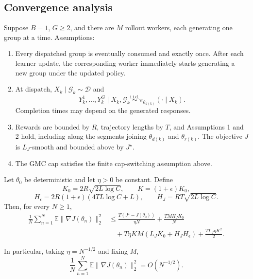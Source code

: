 \subsection{Convergence analysis}


\begin{theorem}
\label{thm:async_gmc}
Suppose $B=1$, $G\ge 2$, and there are $M$ rollout workers,
each generating one group at a time. Assumptions:
\begin{enumerate}
    \item Every dispatched group is eventually consumed and exactly once.
    After each learner update, the corresponding worker immediately
    starts generating a new group under the updated policy.

    \item At dispatch, $X_k\mid\mathcal G_k\sim\mathcal D$ and
    \[
    Y_k^1,\ldots,Y_k^G\mid X_k,\mathcal G_k
    \overset{\mathrm{i.i.d.}}{\sim}
    \pi_{\theta_{d(k)}}(\cdot\mid X_k).
    \]
    Completion times may depend on the generated responses.

    \item Rewards are bounded by $R$, trajectory lengths by $T$,
    and Assumptions 1 and 2 hold, including along the segments
    joining $\theta_{d(k)}$ and $\theta_{r(k)}$.
    The objective $J$ is $L_J$-smooth and bounded above by $J^\star$.

    \item The GMC cap satisfies the finite cap-switching
    assumption above.
\end{enumerate}

Let $\theta_0$ be deterministic and let $\eta>0$ be constant.
Define
\[
K_0=2R\sqrt{2L\log C},\qquad
K=(1+\epsilon)K_0,
\]
\[
H_\epsilon=2R(1+\epsilon)(4TL\log C+L),
\qquad
H_J=RT\sqrt{2L\log C}.
\]
Then, for every $N\ge 1$,
\begin{align*}
\frac1N\sum_{n=1}^N
\mathbb E\|\nabla J(\theta_n)\|_2^2
&\le
\frac{T(J^\star-J(\theta_0))}{\eta N}
+\frac{TMH_JK_0}{N}\\
&\quad+
T\eta KM(L_JK_0+H_JH_\epsilon)
+\frac{TL_J\eta K^2}{2}.
\end{align*}

In particular, taking $\eta=N^{-1/2}$ and fixing $M$,
\[
\frac1N\sum_{n=1}^N
\mathbb E\|\nabla J(\theta_n)\|_2^2
=O(N^{-1/2}).
\]
\end{theorem}


